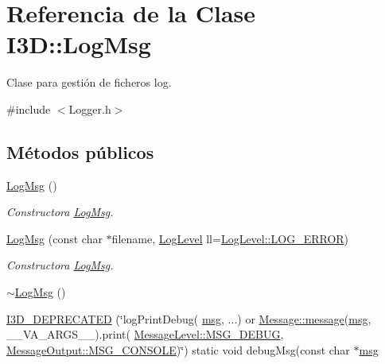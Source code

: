 \hypertarget{class_i3_d_1_1_log_msg}{}\section{Referencia de la Clase I3D\+:\+:Log\+Msg}
\label{class_i3_d_1_1_log_msg}


Clase para gestión de ficheros log.  




{\ttfamily \#include $<$Logger.\+h$>$}

\subsection*{Métodos públicos}
\begin{DoxyCompactItemize}
\item 
\hyperlink{class_i3_d_1_1_log_msg_a5cb7a7b1765778874c2b87d2245463c6}{Log\+Msg} ()
\begin{DoxyCompactList}\small\item\em Constructora \hyperlink{class_i3_d_1_1_log_msg}{Log\+Msg}. \end{DoxyCompactList}\item 
\hyperlink{class_i3_d_1_1_log_msg_ac6d1edcbbc1806f42114374f23cacb8d}{Log\+Msg} (const char $\ast$filename, \hyperlink{namespace_i3_d_ae1af0f2e3b629610c45222809ff521f6}{Log\+Level} ll=\hyperlink{namespace_i3_d_ae1af0f2e3b629610c45222809ff521f6a4490aa3d29644e716440fada68f54032}{Log\+Level\+::\+L\+O\+G\+\_\+\+E\+R\+R\+OR})
\begin{DoxyCompactList}\small\item\em Constructora \hyperlink{class_i3_d_1_1_log_msg}{Log\+Msg}. \end{DoxyCompactList}\item 
\hyperlink{class_i3_d_1_1_log_msg_aa0811c5bd5866194a285bd8d066a4f4c}{$\sim$\+Log\+Msg} ()
\item 
\hyperlink{class_i3_d_1_1_log_msg_ab0af596a2b1485e5d84d6bb948e7e34b}{I3\+D\+\_\+\+D\+E\+P\+R\+E\+C\+A\+T\+ED} (\char`\"{}log\+Print\+Debug( \hyperlink{class_i3_d_1_1_log_msg_a5a1ceb27d9529de8eb9b3fc9377e178a}{msg}, ...) or \hyperlink{class_i3_d_1_1_message_a525f877a41a1e7493188b2b720d1d254}{Message\+::message}(\hyperlink{class_i3_d_1_1_log_msg_a5a1ceb27d9529de8eb9b3fc9377e178a}{msg}, \+\_\+\+\_\+\+V\+A\+\_\+\+A\+R\+G\+S\+\_\+\+\_\+).print( \hyperlink{namespace_i3_d_a994cd716e000a4023e180dcdb9b3a9c0a918e87a1f80863c7ee35bfa2c58cc41e}{Message\+Level\+::\+M\+S\+G\+\_\+\+D\+E\+B\+UG}, \hyperlink{namespace_i3_d_accba1eafa248ca79da818a0b72e60964ace1cd665ada8b4f22dfa5f764fed6c6c}{Message\+Output\+::\+M\+S\+G\+\_\+\+C\+O\+N\+S\+O\+LE})\char`\"{}) static void debug\+Msg(const char $\ast$\hyperlink{class_i3_d_1_1_log_msg_a5a1ceb27d9529de8eb9b3fc9377e178a}{msg}

\end{DoxyCompactItemize}
